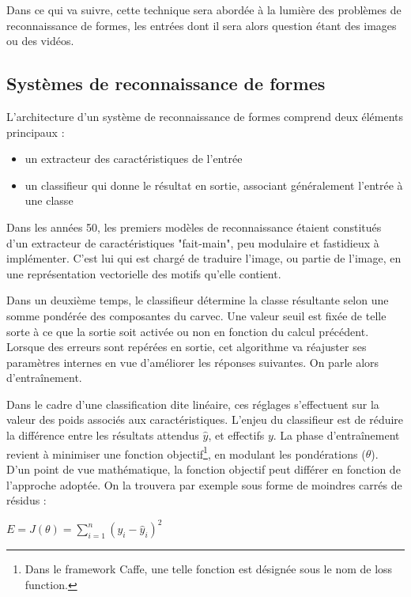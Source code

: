 \documentclass[a4paper,10pt]{report}
\begin{document}
Dans ce qui va suivre, cette technique sera abordée à la lumière des problèmes de reconnaissance de formes, les entrées dont il sera alors question étant des images ou des vidéos.

\subsection{Systèmes de reconnaissance de formes}

L'architecture d'un système de reconnaissance de formes comprend deux éléments principaux :

\begin{itemize}
  \item un extracteur des caractéristiques de l'entrée
  \item un classifieur qui donne le résultat en sortie, associant généralement l'entrée à une classe
\end{itemize}



Dans les années 50, les premiers modèles de reconnaissance étaient constitués d'un extracteur de caractéristiques "fait-main", peu modulaire et fastidieux à implémenter\cite{Bib_LeCun}.
C'est lui qui est chargé de traduire l'image, ou partie de l'image, en une représentation vectorielle des motifs qu'elle contient.
\par
Dans un deuxième temps, le classifieur détermine la classe résultante selon une somme pondérée des composantes du \gls{carvec}.
Une valeur seuil est fixée de telle sorte à ce que la sortie soit activée ou non en fonction du calcul précédent.
Lorsque des erreurs sont repérées en sortie, cet algorithme va réajuster ses paramètres internes en vue d'améliorer les réponses suivantes. On parle alors d'entraînement.
\par
Dans le cadre d'une classification dite linéaire, ces réglages s'effectuent sur la valeur des poids associés aux caractéristiques.
L'enjeu du classifieur est de réduire la différence entre les résultats attendus $\hat{y}$, et effectifs $y$.
La phase d'entraînement revient à minimiser une fonction objectif\footnote{Dans le framework Caffe, une telle fonction est désignée sous le nom de loss function.}, en modulant les pondérations ($\theta$).
D'un point de vue mathématique, la fonction objectif peut différer en fonction de l'approche adoptée. On la trouvera par exemple sous forme de moindres carrés de résidus\cite{Bib_WikiLS} :

\begin{center} $ E = J({\theta}) =  \sum\limits_{i=1}^{n} (y_{i} - \hat{y}_{i} )^2 $ \end{center}
\end{document}

